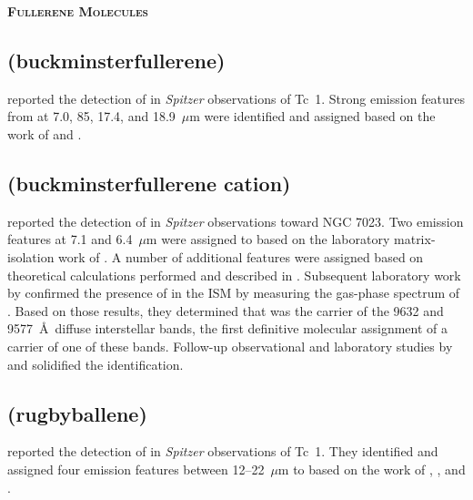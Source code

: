 \documentclass[twocolumn]{aastex631}
\begin{document}
    \begin{center}
        \large
        \textsc{\textbf{Fullerene Molecules}}
        \label{fullerenes}
        \normalsize
    \end{center}	
    
    \subsection{ (buckminsterfullerene)}
	\label{C60}
	
	\citet{Cami:2010fi} reported the detection of  in \emph{Spitzer} observations of Tc~1.  Strong emission features from  at 7.0, 85, 17.4, and 18.9~$\mu$m were identified and assigned based on the work of \citet{Martin:1993cj} and \citet{Fabian:1996hd}.
	
    \subsection{ (buckminsterfullerene cation)}
	\label{C60+}
	
	\citet{Berne:2013ow} reported the detection of  in \emph{Spitzer} observations toward NGC 7023.  Two emission features at 7.1 and 6.4~$\mu$m were assigned to  based on the laboratory matrix-isolation work of \citet{Kern:2013jk}.  A number of additional features were assigned based on theoretical calculations performed and described in \citet{Berne:2013ow}.  Subsequent laboratory work by \citet{Campbell:2015hp} confirmed the presence of  in the ISM by measuring the gas-phase spectrum of .  Based on those results, they determined that  was the carrier of the 9632 and 9577~\AA~diffuse interstellar bands, the first definitive molecular assignment of a carrier of one of these bands.  Follow-up observational and laboratory studies by \citet{Walker:2015ey} and \citet{Campbell:2016hl} solidified the identification.
	
    \subsection{ (rugbyballene)}
	\label{C70}	
	
	\citet{Cami:2010fi} reported the detection of  in \emph{Spitzer} observations of Tc~1. They identified and assigned four emission features between 12--22~$\mu$m to  based on the work of \citet{Nemes:1994jm}, \citet{vonCzarnowski:1995iv}, and \citet{Stratmann:1998dr}.
\end{document}
